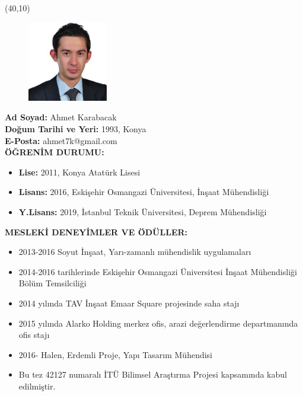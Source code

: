 \vspace{10mm}

\noindent \newsavebox{\mysquare}
\savebox{\mysquare}{\textcolor{black}{\rule[2.3pt]{3.4pt}{3.4pt}}}

\setlength{\TPHorizModule}{10pt}
\setlength{\TPVertModule}{10pt}

\begin{textblock}{1}(40,10)
 	\begin{figure}[p]
		\includegraphics[width=3.5cm,keepaspectratio=true]{./fig/CV.jpg}
	\end{figure}
\end{textblock}

\noindent \textbf{Ad Soyad:} Ahmet Karabacak \\

\vspace{-3mm}
 \textbf{Doğum Tarihi ve Yeri:} 1993, Konya \\

\vspace{-3mm}
 \textbf{E-Posta:} ahmet7k@gmail.com \\

\textbf{ÖĞRENİM DURUMU:} \vspace{-3mm}
\begin{itemize}
	\item \textbf{Lise:} 2011, Konya Atatürk Lisesi 
	\item \textbf{Lisans:} 2016, Eskişehir Osmangazi Üniversitesi, İnşaat Mühendisliği
	\item \textbf{Y.Lisans:} 2019, İstanbul Teknik Üniversitesi, Deprem Mühendisliği 

\end{itemize}

\textbf{MESLEKİ DENEYİMLER VE ÖDÜLLER:} \vspace{-3mm}
\begin{itemize}
	\item 2013-2016 Soyut İnşaat, Yarı-zamanlı mühendislik uygulamaları
	\item 2014-2016 tarihlerinde Eskişehir Osmangazi Üniversitesi İnşaat Mühendisliği Bölüm Temsilciliği
	\item 2014 yılında TAV İnşaat Emaar Square projesinde saha stajı
	\item 2015 yılında Alarko Holding merkez ofis, arazi değerlendirme departmanında ofis stajı
	\item 2016- Halen, Erdemli Proje, Yapı Tasarım Mühendisi
	\item Bu tez 42127 numaralı İTÜ Bilimsel Araştırma Projesi kapsamında kabul edilmiştir.
\end{itemize}


